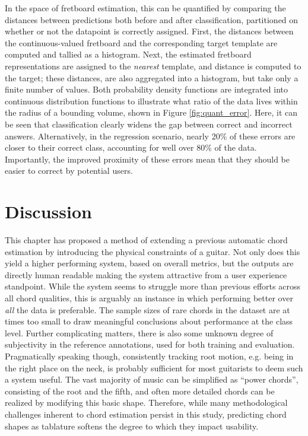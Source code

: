 In the space of fretboard estimation, this can be quantified by comparing the distances between predictions both before and after classification, partitioned on whether or not the datapoint is correctly assigned.
First, the distances between the continuous-valued fretboard and the corresponding target template are computed and tallied as a histogram.
Next, the estimated fretboard representations are assigned to the \emph{nearest} template, and distance is computed to the target; these distances, are also aggregated into a histogram, but take only a finite number of values.
Both probability density functions are integrated into continuous distribution functions to illustrate what ratio of the data lives within the radius of a bounding volume, shown in Figure \ref{fig:quant_error}.
Here, it can be seen that classification clearly widens the gap between correct and incorrect answers.
Alternatively, in the regression scenario, nearly 20\% of these errors are closer to their correct class, accounting for well over 80\% of the data.
Importantly, the improved proximity of these errors mean that they should be easier to correct by potential users.


\section{Discussion}

This chapter has proposed a method of extending a previous automatic chord estimation by introducing the physical constraints of a guitar.
Not only does this yield a higher performing system, based on overall metrics, but the outputs are directly human readable making the system attractive from a user experience standpoint.
While the system seems to struggle more than previous efforts across all chord qualities, this is arguably an instance in which performing better over \emph{all} the data is preferable.
The sample sizes of rare chords in the dataset are at times too small to draw meaningful conclusions about performance at the class level.
Further complicating matters, there is also some unknown degree of subjectivity in the reference annotations, used for both training and evaluation.
Pragmatically speaking though, consistently tracking root motion, e.g. being in the right place on the neck, is probably sufficient for most guitarists to deem such a system useful.
The vast majority of music can be simplified as ``power chords'', consisting of the root and the fifth, and often more detailed chords can be realized by modifying this basic shape.
Therefore, while many methodological challenges inherent to chord estimation persist in this study, predicting chord shapes as tablature softens the degree to which they impact usability.

